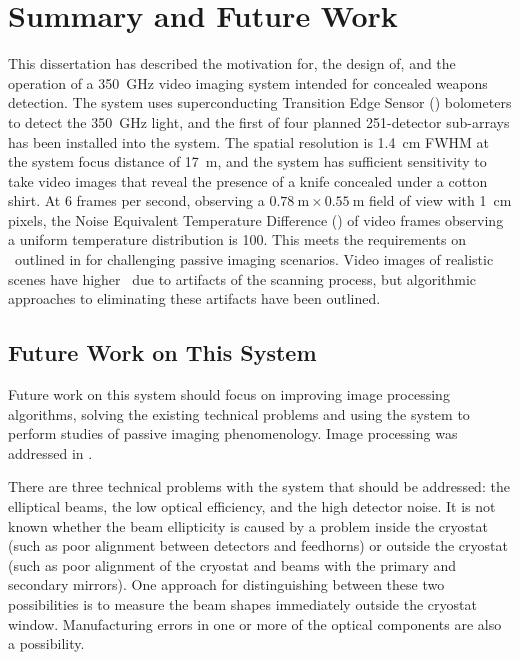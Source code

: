 \chapter{Summary and Future Work} \label{c:summary}

This dissertation has described the motivation for, the design of, and the operation of a \SI{350}{\GHz} video imaging system intended for concealed weapons detection.
The system uses superconducting Transition Edge Sensor (\TES) bolometers to detect the \SI{350}{\GHz} light, and the first of four planned 251-detector sub-arrays has been installed into the system.
The spatial resolution is \SI{1.4}{\cm} FWHM at the system focus distance of \SI{17}{\m}, and the system has sufficient sensitivity to take video images that reveal the presence of a knife concealed under a cotton shirt.
At 6 frames per second, observing a $\SI{0.78}{\m} \times \SI{0.55}{\m}$ field of view with \SI{1}{\cm} pixels, the Noise Equivalent Temperature Difference (\NETD) of video frames observing a uniform temperature distribution is \SI{100}{\mK}.
This meets the requirements on \NETD\ outlined in  for challenging passive imaging scenarios.
Video images of realistic scenes have higher \NETD\ due to artifacts of the scanning process, but algorithmic approaches to eliminating these artifacts have been outlined.

\section{Future Work on This System} \label{sec:ch8-future}

Future work on this system should focus on improving image processing algorithms, solving the existing technical problems and using the system to perform studies of passive imaging phenomenology.
Image processing was addressed in .

There are three technical problems with the system that should be addressed: the elliptical beams, the low optical efficiency, and the high detector noise.
It is not known whether the beam ellipticity is caused by a problem inside the cryostat (such as poor alignment between detectors and feedhorns) or outside the cryostat (such as poor alignment of the cryostat and beams with the primary and secondary mirrors).
One approach for distinguishing between these two possibilities is to measure the beam shapes immediately outside the cryostat window.
Manufacturing errors in one or more of the optical components are also a possibility.

